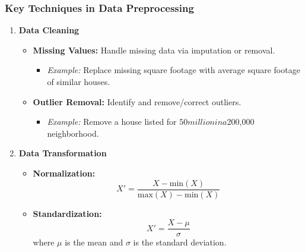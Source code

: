 \documentclass[aspectratio=169]{beamer}
\begin{document}
\begin{frame}[fragile]
    \frametitle{Key Techniques in Data Preprocessing}
    \begin{enumerate}
        \item \textbf{Data Cleaning}
            \begin{itemize}
                \item \textbf{Missing Values:} Handle missing data via imputation or removal.
                    \begin{itemize}
                        \item \textit{Example:} Replace missing square footage with average square footage of similar houses.
                    \end{itemize}
                \item \textbf{Outlier Removal:} Identify and remove/correct outliers.
                    \begin{itemize}
                        \item \textit{Example:} Remove a house listed for $50 million in a $200,000 neighborhood.
                    \end{itemize}
            \end{itemize}
        
        \item \textbf{Data Transformation}
            \begin{itemize}
                \item \textbf{Normalization:} 
                    \[
                    X' = \frac{X - \text{min}(X)}{\text{max}(X) - \text{min}(X)}
                    \]
                \item \textbf{Standardization:} 
                    \[
                    X' = \frac{X - \mu}{\sigma}
                    \]
                    where $\mu$ is the mean and $\sigma$ is the standard deviation.
            \end{itemize}
    \end{enumerate}
\end{frame}
\end{document}
